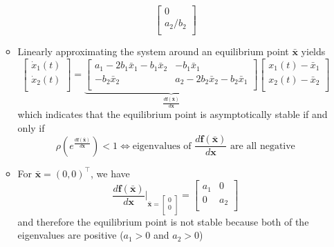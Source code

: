 \documentclass[12pt,a4paper]{article}
\begin{document}
\begin{itemize}
\begin{itemize}
\begin{equation}
\begin{bmatrix}
          0 \\
          a_{2}/b_{2} \\
        \end{bmatrix}
    \end{equation}
  \item Linearly approximating the system around an equilibrium point $\bar{\bm{x}}$ yields
    \begin{equation}\nonumber%
      \begin{bmatrix}
        \dot{x}_{1}(t) \\
        \dot{x}_{2}(t) \\
      \end{bmatrix}
      = \underbrace{
        \begin{bmatrix}
          a_{1} - 2b_{1}\bar{x}_{1} - b_{1}\bar{x}_{2} & -b_{1}\bar{x}_{1} \\
          -b_{2}\bar{x}_{2} & a_{2} - 2b_{2}\bar{x}_{2} - b_{2}\bar{x}_{1} \\
        \end{bmatrix}
      }_{\frac{d\bm{f}(\bar{\bm{x}})}{d\bm{x}}}
      \begin{bmatrix}
        x_{1}(t)-\bar{x}_{1} \\
        x_{2}(t)-\bar{x}_{2} \\
      \end{bmatrix}
    \end{equation}
    which indicates that the equilibrium point is asymptotically stable
    if and only if
    \begin{equation}\nonumber%
      \rho \left(e^{\frac{d\bm{f}(\bar{\bm{x}})}{d\bm{x}}}\right) < 1
      \iff
      \text{eigenvalues of $\frac{d\bm{f}(\bar{\bm{x}})}{d\bm{x}}$ are all negative}
    \end{equation}

  \item For $\bar{\bm{x}}=(0, 0)^{\top}$, we have
    \begin{equation}\nonumber%
      \frac{d\bm{f}(\bar{\bm{x}})}{d\bm{x}}\bigg|_{
        \bar{\bm{x}}=
        \begin{bmatrix}
          0 \\
          0 \\
        \end{bmatrix}
      }
      =
      \begin{bmatrix}
        a_{1} & 0 \\
        0 & a_{2} \\
      \end{bmatrix}
    \end{equation}
    and therefore
    the equilibrium point is not stable because both of the eigenvalues are positive ($a_{1}>0$ and $a_{2}>0$)
    

\end{itemize}
\end{itemize}
\end{document}

